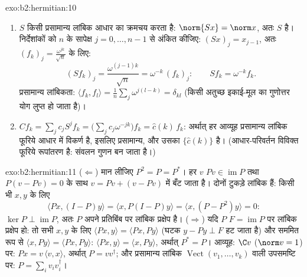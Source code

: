 \begin{solution}{exo:b2:hermitian:10}
\begin{enumerate}
  \item $S$ किसी प्रसामान्य लांबिक आधार का क्रमचय करता है: $\norm{Sx} = \norm
        x$, अतः $S$
         है। निर्देशांकों को $n$ के सापेक्ष $j = 0,
        \dots, n-1$ से अंकित कीजिए:
        $(Sx)_j = x_{j-1}$, अतः $(f_k)_j = \frac{\omega^{jk}}{\sqrt n}$ के लिए:
        \[
        (Sf_k)_j = \frac{\omega^{(j-1)k}}{\sqrt n}
        = \omega^{-k}\,(f_k)_j :
        \qquad Sf_k = \omega^{-k}f_k .
        \]
        प्रसामान्य लांबिकता: $\langle f_k, f_l\rangle = \frac1n
        \sum_j \omega^{j(l-k)} = \delta_{kl}$ (किसी अतुच्छ इकाई-मूल का गुणोत्तर योग
        लुप्त हो जाता है)।
  \item $Cf_k = \sum_j c_j S^jf_k = \bigl(\sum_j
        c_j\omega^{-jk}\bigr)f_k = \widehat c(k)\,f_k$: अर्थात् हर  आव्यूह प्रसामान्य लांबिक फूरिये आधार में
        विकर्ण है, इसलिए प्रसामान्य, और उसका  $\{\widehat c(k)\}$ है।
        (आधार-परिवर्तन विविक्त फूरिये रूपांतरण है: संवलन गुणन बन जाता
        है।)
\end{enumerate}
\end{solution}

\begin{solution}{exo:b2:hermitian:11}
($\Leftarrow$) मान लीजिए $P^2 = P = P^*$। हर $v$ $Pv \in \operatorname{im} P$ तथा $P(v - Pv) =
0$ के साथ $v = Pv
+ (v - Pv)$ में बँट जाता है। दोनों
टुकड़े लांबिक हैं: किसी भी $x, y$ के लिए
\[
\langle Px, (I - P)y\rangle = \langle x, P(I-P)y\rangle
= \langle x, (P - P^2)y\rangle = 0 :
\]
$\ker P \perp \operatorname{im} P$, अतः $P$ अपने प्रतिबिंब पर लांबिक प्रक्षेप है। ($\Rightarrow$) यदि $P$ $F = \operatorname{im}P$
पर लांबिक प्रक्षेप हो: तो सभी $x, y$ के लिए $\langle Px, y\rangle = \langle Px, Py\rangle$ (घटक $y - Py \perp F$ हट जाता है) और
सममित रूप से $\langle
x, Py\rangle = \langle Px, Py\rangle$: $\langle Px, y\rangle =
\langle x, Py\rangle$, अर्थात् $P^* = P$। आव्यूह: $\C v$ ($\norm v = 1$) पर: $Px = v\,\langle v, x\rangle$,
अर्थात् $P =
vv^\dagger$; और प्रसामान्य लांबिक $\operatorname{Vect}(v_1, \dots, v_k)$ वाली उपसमष्टि पर: $P = \sum_i v_iv_i^\dagger$।
\end{solution}

